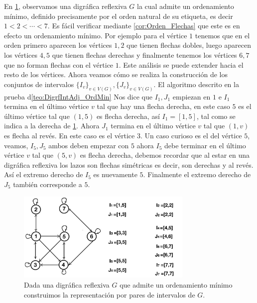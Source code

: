 En \cref{fig:MinOrdToIntGrph}, observamos una digr\'afica reflexiva $G$ la cual admite un ordenamiento mínimo, definido precisamente por el orden natural de su etiqueta, es decir $1<2< \cdots <7$. Es f\'acil verificar mediante \cref{cor:Orden_Flechas} que este es en efecto un ordenamiento mínimo. Por ejemplo para el v\'ertice $1$ tenemos que en el orden primero aparecen los v\'ertices $1,2$ que tienen flechas dobles, luego aparecen los v\'ertices $4,5$ que tienen flechas derechas y finalmente tenemos los v\'ertices $6,7$ que no forman flechas con el v\'ertice $1$. Este an\'alisis se puede extender hacia el resto de los v\'ertices.
Ahora veamos c\'omo se realiza la construcci\'on de los conjuntos de intervalos $\{I_v\}_{v\in V(G)}, \{J_v\}_{v\in V(G)}$. El algoritmo descrito en la prueba  d\cref{teo:DigrfIntAdj_OrdMin} Nos dice que $I_1, J_1$ empiezan en $1$ e $I_1$ termina en el último v\'ertice $v$ tal que hay una flecha derecha, en este caso $5$ es el último v\'ertice tal que $(1,5)$ es flecha derecha, así $I_1=[1,5]$, tal como se indica a la derecha de \cref{fig:MinOrdToIntGrph}. Ahora $J_1$ termina en el último v\'ertice $v$ tal que $(1,v)$ es flecha al rev\'es. En este caso es el v\'ertice $3$. Un caso curioso es el del v\'ertice $5$, veamos, $I_5,J_5$ ambos deben empezar con $5$ ahora $I_5$ debe terminar en el último v\'ertice $v$ tal que $(5,v)$ es flecha derecha, debemos recordar que al estar en una digr\'afica reflexiva los lazos son flechas sim\'etricas es decir, son derechas y al rev\'es. Así el extremo derecho de $I_5$ es nuevamente $5$. Finalmente el extremo derecho de $J_5$ tambi\'en corresponde a $5$. 


\begin{figure}[H]
  \centering
  \includegraphics[width=0.75\textwidth]{recursos/capturas/MinOrdToIntGrph.jpg}
  \caption{Dada una digr\'afica reflexiva $G$ que admite un ordenamiento mínimo construimos la representaci\'on por pares de intervalos de $G$.}
  \label{fig:MinOrdToIntGrph}
\end{figure}

